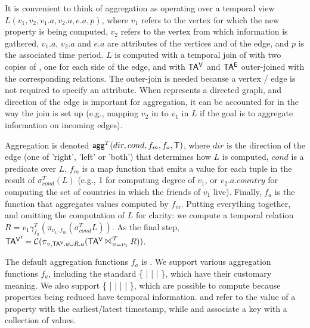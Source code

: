 It is convenient to think of aggregation as operating over a temporal
view $L(v_1,v_2,v_1.a,v_2.a,e.a,p)$, where $v_1$ refers to the vertex
for which the new property is being computed, $v_2$ refers to the
vertex from which information is gathered, $v_1.a$, $v_2.a$ and $e.a$
are attributes of the vertices and of the edge, and $p$ is the
associated time period.  $L$ is computed with a temporal join of \te
with two copies of \tv, one for each side of the edge, and with $\mathsf{TA^{V}}$
and $\mathsf{TA^{E}}$ outer-joined with the corresponding relations.  The
outer-join is needed because a vertex / edge is not required to
specify an attribute.  When \tve represents a directed graph, and
direction of the edge is important for aggregation, it can be
accounted for in the way the join is set up (e.g., mapping $v_2$ in
\tae to $v_1$ in $L$ if the goal is to aggregate information on
incoming edges).

Aggregation is denoted $\textsf{agg}^T(dir,cond,f_m,f_a,\mathsf{T})$, where
$dir$ is the direction of the edge (one of 'right', 'left' or 'both')
that determines how $L$ is computed, $cond$ is a predicate over $L$,
$f_m$ is a map function that emits a value for each tuple in the
result of $\sigma^T_{cond}(L)$ (e.g., 1 for computung degree of $v_1$,
or $v_2.a.country$ for computing the set of countries in which the
friends of $v_1$ live).  Finally, $f_a$ is the function that
aggregates values computed by $f_m$.  Putting everything together, and
omitting the computation of $L$ for clarity: we compute a temporal
relation $R = v_1 \gamma^T_{f_a} (\pi_{v_1,f_m} (\sigma^T_{cond} L))$.
As the final step, $\tav' = \coal{\pi_{v, \tav.a \cup R.a} (\tav
  \rightouterjoin^T_{v=v_1} R)}$.


The default aggregation functions $f_a$ is .  We support
various aggregation functions $f_a$, including the standard \{
 |  |  |  \}, which have
their customary meaning.  We also support \{  |
 |  |  |  \}, which
are possible to compute because properties being reduced have temporal
information.   and  refer to the value of a
property with the earliest/latest timestamp, while  and
 associate a key with a collection of values.

